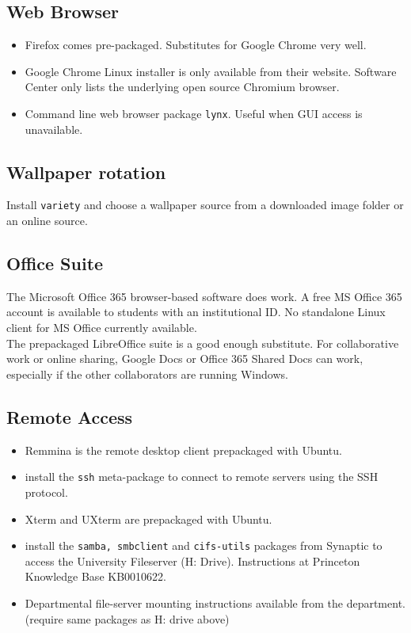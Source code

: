 \documentclass[8pt,letterpaper,twocolumn]{article}
\begin{document}
\subsection{Web Browser}

\begin{itemize}
	\item Firefox comes pre-packaged. Substitutes for Google Chrome very well.
	\item Google Chrome Linux installer is only available from their website. Software Center only lists the underlying open source Chromium browser.
	\item Command line web browser package \texttt{lynx}. Useful when GUI access is unavailable.
	
\end{itemize}

\subsection{Wallpaper rotation}

Install \texttt{variety} and choose a wallpaper source from a downloaded image folder or an online source.
\subsection{Office Suite}

The Microsoft Office 365 browser-based software does work. A free MS Office 365 account is available to students with an institutional ID. No standalone Linux client for MS Office currently available. \\

The prepackaged LibreOffice suite is a good enough substitute. For collaborative work or online sharing, Google Docs or Office 365 Shared Docs can work, especially if the other collaborators are running Windows.

\subsection{Remote Access}

\begin{itemize}
	\item Remmina is the remote desktop client prepackaged with Ubuntu.
	\item install the \texttt{ssh} meta-package to connect to remote servers using the SSH protocol.
	\item Xterm and UXterm are prepackaged with Ubuntu.
	\item install the \texttt{samba, smbclient} and \texttt{cifs-utils} packages from Synaptic to access the University Fileserver (H: Drive). Instructions at Princeton Knowledge Base KB0010622.
	\item Departmental file-server mounting instructions available from the department. (require same packages as H: drive above)
	 
\end{itemize}
\end{document}
